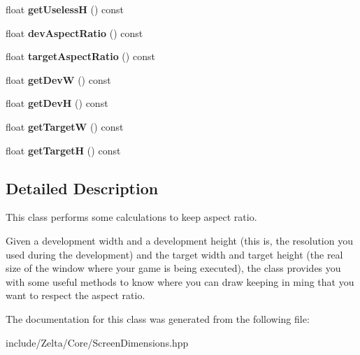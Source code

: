 \begin{DoxyCompactItemize}
float {\bfseries get\+UselessH} () const
\item 
\mbox{\label{classzt_1_1_screen_dimensions_a2042312cd93d3bdc77fcf0ff69570084}} 
float {\bfseries dev\+Aspect\+Ratio} () const
\item 
\mbox{\label{classzt_1_1_screen_dimensions_adca68ccecdc0e3368f033d5316318e96}} 
float {\bfseries target\+Aspect\+Ratio} () const
\item 
\mbox{\label{classzt_1_1_screen_dimensions_aab1a31506b3398f42b05ba4b867da622}} 
float {\bfseries get\+DevW} () const
\item 
\mbox{\label{classzt_1_1_screen_dimensions_aff6e3ed167ece686c764c9cc2625593f}} 
float {\bfseries get\+DevH} () const
\item 
\mbox{\label{classzt_1_1_screen_dimensions_ac8638b29de8e36f3aa9b224a21565c2c}} 
float {\bfseries get\+TargetW} () const
\item 
\mbox{\label{classzt_1_1_screen_dimensions_a19ca5481c1d6a66704b2a6933dbebd8c}} 
float {\bfseries get\+TargetH} () const
\end{DoxyCompactItemize}


\subsection{Detailed Description}
This class performs some calculations to keep aspect ratio. 

Given a development width and a development height (this is, the resolution you used during the development) and the target width and target height (the real size of the window where your game is being executed), the class provides you with some useful methods to know where you can draw keeping in ming that you want to respect the aspect ratio. 

The documentation for this class was generated from the following file\+:\begin{DoxyCompactItemize}
\item 
include/\+Zelta/\+Core/Screen\+Dimensions.\+hpp\end{DoxyCompactItemize}
